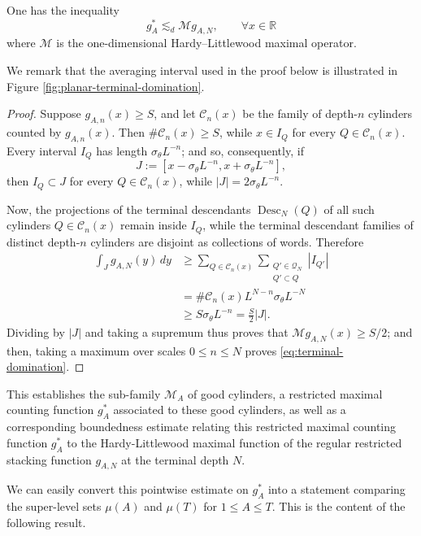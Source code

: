\documentclass[12pt]{amsart}
\numberwithin{equation}{section}
\newcommand{\cM}{\mathcal{M}}
\newcommand{\Q}{\mathbb Q}
\begin{document}
\begin{lemma}\label{lem:terminal-domination}
One has the inequality
\begin{equation}\label{eq:terminal-domination}
 g_A^*\lesssim_d\cM g_{A,N}, \qquad \forall x \in \mathbb{R}
\end{equation}
where $\cM$ is the one-dimensional Hardy--Littlewood maximal operator.
\end{lemma}

We remark that the averaging interval used in the proof below is illustrated in Figure
\ref{fig:planar-terminal-domination}.

\begin{proof}
Suppose $g_{A,n}(x)\geq S$, and let $\mathscr C_n(x)$ be the family of
depth-$n$ cylinders counted by $g_{A,n}(x)$. Then $\# \mathscr{C}_n(x) \geq S$, while $x \in I_Q$ for every $Q \in \mathscr{C}_n (x)$. Every interval $I_Q$ has length $\sigma_\theta L^{-n}$; and so, consequently, if
\[
 J:=[x-\sigma_\theta L^{-n},x+\sigma_\theta L^{-n}],
\]
then $I_Q\subset J$ for every $Q\in\mathscr C_n(x)$, while
$|J|=2\sigma_\theta L^{-n}$.  

Now, the projections of the terminal descendants $\operatorname{Desc}_N(Q)$ of all such cylinders $Q \in \mathscr{C}_n (x)$ remain inside $I_Q$, while the terminal descendant families of distinct
depth-$n$ cylinders are disjoint as collections of words.  Therefore
\begin{align*}
 \int_J g_{A,N}(y)\,dy
 &\geq
 \sum_{Q\in\mathscr C_n(x)}
 \sum_{\substack{Q'\in\mathscr Q_N\\Q'\subset Q}}|I_{Q'}|\\
 &=\#\mathscr C_n(x)L^{N-n}\sigma_\theta L^{-N}\\
 &\geq S\sigma_\theta L^{-n}
 =\frac S2|J|.
\end{align*}
Dividing by $|J|$ and taking a supremum thus proves that $\cM g_{A,N}(x)\geq S/2$; and then, taking a maximum over scales
$0\leq n\leq N$ proves \eqref{eq:terminal-domination}.
\end{proof}

This establishes the sub-family $\mathscr{M}_A$ of good cylinders, a restricted maximal counting function $g_A^*$ associated to these good cylinders, as well as a corresponding boundedness estimate relating this restricted maximal counting function $g_A^*$ to the Hardy-Littlewood maximal function of the regular restricted stacking function $g_{A,N}$ at the terminal depth $N$.

We can easily convert this pointwise estimate on $g_A^*$ into a statement comparing the super-level sets $\mu(A)$ and $\mu(T)$ for $1 \leq A \leq T$. This is the content of the following result.
\end{document}
